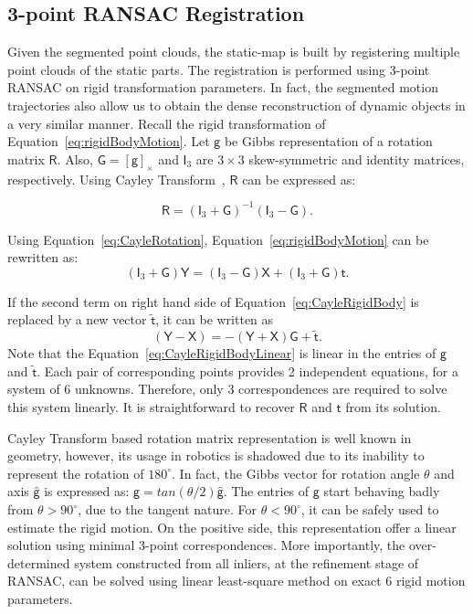 \documentclass[10pt,twocolumn,letterpaper]{article}  %
\begin{document}
\subsection{3-point RANSAC Registration}
Given the segmented point clouds, the static-map is built by registering multiple point clouds of the static parts. The registration is performed using 3-point RANSAC on rigid transformation parameters. In fact, the segmented  motion trajectories also allow us to obtain the dense reconstruction of dynamic objects in a very similar manner. Recall the rigid transformation of Equation~\eqref{eq:rigidBodyMotion}. Let $\mathsf{g}$ be Gibbs representation of a rotation matrix $\mathsf{R}$. Also, $\mathsf{G}=[\mathsf{g}]_\times$ and $\mathsf{I}_3$ are $3\times 3$ skew-symmetric and identity matrices, respectively. Using Cayley Transform~\cite{c30}, $\mathsf{R}$ can be expressed as:

\begin{equation}
\label{eq:CayleRotation}
\mathsf{R} =(\mathsf{I}_3 + \mathsf{G})^{-1} (\mathsf{I}_3 - \mathsf{G}).    
\end{equation}

Using Equation~\eqref{eq:CayleRotation}, Equation~\eqref{eq:rigidBodyMotion} can be rewritten as:
\begin{equation}
\label{eq:CayleRigidBody}
(\mathsf{I}_3 + \mathsf{G})\mathsf{Y} = (\mathsf{I}_3 - \mathsf{G})\mathsf{X}+ (\mathsf{I}_3 + \mathsf{G})\mathsf{t}.    
\end{equation}

If the second term on right hand side of Equation~\eqref{eq:CayleRigidBody} is replaced by a new vector $\tilde{\mathsf{t}}$, it can be written as
  \begin{equation}
\label{eq:CayleRigidBodyLinear}
(\mathsf{Y}-\mathsf{X}) = -(\mathsf{Y}+\mathsf{X})\mathsf{G}+ \tilde{\mathsf{t}}.    
\end{equation}
Note that the Equation~\eqref{eq:CayleRigidBodyLinear} is linear in the entries of $\mathsf{g}$ and $\tilde{\mathsf{t}}$. Each pair of corresponding points provides 2 independent equations, for a system of 6 unknowns. Therefore, only 3 correspondences are required to solve this system linearly. It is straightforward to recover $\mathsf{R}$ and $\mathsf{t}$ from its solution. 

Cayley Transform based rotation matrix representation is well known in geometry, however, its usage in robotics is shadowed due to its inability to represent the rotation of $180^{\circ}$. In fact, the Gibbs vector for rotation angle $\theta$ and axis $\hat{\mathsf{g}}$ is expressed as: $\mathsf{g}=tan(\theta/2)\hat{\mathsf{g}}$. The entries of  $\mathsf{g}$ start behaving badly from $\theta>90^{\circ}$, due to the tangent nature. For $\theta<90^{\circ}$, it can be safely used to estimate the rigid motion. On the positive side, this representation offer a linear solution using minimal 3-point correspondences. More importantly, the over-determined system constructed from all inliers, at the refinement stage of RANSAC, can be solved using linear least-square method on exact 6 rigid motion parameters. 
\end{document}
